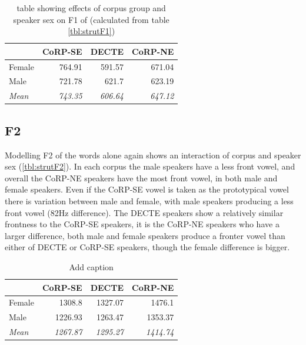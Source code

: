 \documentclass[../../../00.FullDoc/tex/ThesisSkeleton-draft2]{subfiles}
\begin{document}
\begin{table}[htbp]
	\centering
	\begin{tabular}{lrrr}
		\hline
		& \multicolumn{1}{l}{CoRP-SE} & \multicolumn{1}{l}{DECTE} & \multicolumn{1}{l}{CoRP-NE} \\
		\hline
		Female & 764.91 & 591.57 & 671.04 \\
		Male  & 721.78 & 621.7 & 623.19 \\
		\textit{Mean} & \textit{743.35} & \textit{606.64} & \textit{647.12} \\
		\hline
	\end{tabular}%
	\caption{table showing effects of corpus group and speaker sex on F1 of \strutt{} (calculated from table \ref{tbl:strutF1})}
	\label{tbl:strutF1inter}%
\end{table}%

\begin{figure}[h]
	
	\caption{} \label{fig:strutF1-sex}
\end{figure}


\subsection{F2}
Modelling F2 of the \strutt{} words alone again shows an interaction of corpus and speaker sex (\ref{tbl:strutF2}). In each corpus the male speakers have a less front vowel, and overall the CoRP-NE speakers have the most front vowel, in both male and female speakers. Even if the CoRP-SE vowel is taken as the prototypical \strutt{} vowel there is variation between male and female, with male speakers producing a less front vowel (82Hz difference). The DECTE speakers show a relatively similar frontness to the CoRP-SE speakers, it is the CoRP-NE speakers who have a larger difference, both male and female speakers produce a fronter vowel than either of DECTE or CoRP-SE speakers, though the female difference is bigger.


\begin{table}[htbp]
	\centering
	\caption{Add caption}
	\begin{tabular}{lrrr}
		\hline
		& \multicolumn{1}{l}{CoRP-SE} & \multicolumn{1}{l}{DECTE} & \multicolumn{1}{l}{CoRP-NE} \\
		\hline
		Female & 1308.8 & 1327.07 & 1476.1 \\
		Male  & 1226.93 & 1263.47 & 1353.37 \\
		\textit{Mean} & \textit{1267.87} & \textit{1295.27} & \textit{1414.74} \\
		\hline
	\end{tabular}%
	\label{tbl:strutF2-inter}%
\end{table}%
\end{document}
